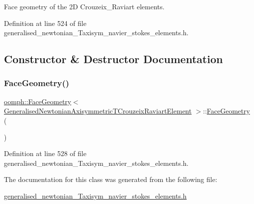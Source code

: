 Face geometry of the 2D Crouzeix\+\_\+\+Raviart elements. 

Definition at line 524 of file generalised\+\_\+newtonian\+\_\+\+Taxisym\+\_\+navier\+\_\+stokes\+\_\+elements.\+h.



\subsection{Constructor \& Destructor Documentation}
\mbox{\label{classoomph_1_1FaceGeometry_3_01GeneralisedNewtonianAxisymmetricTCrouzeixRaviartElement_01_4_ac20d2f6f91760aee922fb938086c7f0a}} 
\subsubsection{\texorpdfstring{Face\+Geometry()}{FaceGeometry()}}
{\footnotesize\ttfamily \hyperlink{classoomph_1_1FaceGeometry}{oomph\+::\+Face\+Geometry}$<$ \hyperlink{classoomph_1_1GeneralisedNewtonianAxisymmetricTCrouzeixRaviartElement}{Generalised\+Newtonian\+Axisymmetric\+T\+Crouzeix\+Raviart\+Element} $>$\+::\hyperlink{classoomph_1_1FaceGeometry}{Face\+Geometry} (\begin{DoxyParamCaption}{ }\end{DoxyParamCaption})\hspace{0.3cm}{\ttfamily [inline]}}



Definition at line 528 of file generalised\+\_\+newtonian\+\_\+\+Taxisym\+\_\+navier\+\_\+stokes\+\_\+elements.\+h.



The documentation for this class was generated from the following file\+:\begin{DoxyCompactItemize}
\item 
\hyperlink{generalised__newtonian__Taxisym__navier__stokes__elements_8h}{generalised\+\_\+newtonian\+\_\+\+Taxisym\+\_\+navier\+\_\+stokes\+\_\+elements.\+h}\end{DoxyCompactItemize}
